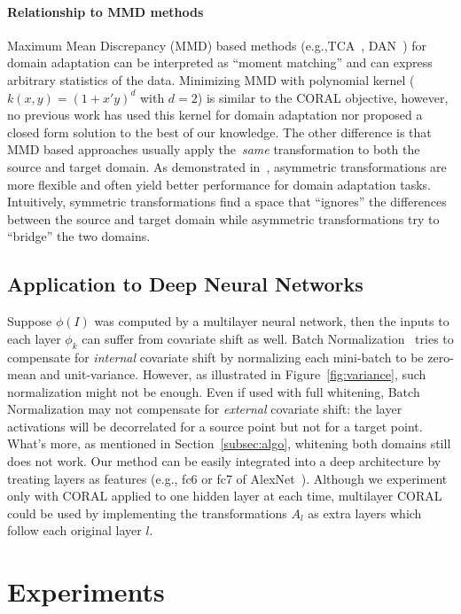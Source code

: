 \documentclass[letterpaper]{article}
\begin{document}
\paragraph{Relationship to MMD methods}
Maximum Mean Discrepancy (MMD) based methods (e.g.,TCA~\cite{tca}, DAN~\cite{dan_long15}) for domain adaptation can be interpreted as ``moment matching'' and can express arbitrary statistics of the data. Minimizing MMD with polynomial kernel ($k(x,y) = (1+x'y)^d$ with $d=2$) is similar to the CORAL objective, however, no previous work has used this kernel for domain adaptation nor proposed a closed form solution to the best of our knowledge.
The other difference is that MMD based approaches usually apply the~\emph{same} transformation to both the source and target domain.  As demonstrated in~\cite{ref:kulis_cvpr11,outlooks,sasb}, asymmetric transformations are more flexible and often yield better performance for domain adaptation tasks. Intuitively, symmetric transformations find a space that ``ignores'' the differences between the source and target domain while asymmetric transformations try to ``bridge'' the two domains.

\subsection{Application to Deep Neural Networks}
Suppose $\phi(I)$ was computed by a multilayer neural network, then the inputs to each layer $\phi_k$ can suffer from covariate shift as well. Batch Normalization~\cite{batchnorm} tries to compensate for \emph{internal} covariate shift by normalizing each mini-batch to be zero-mean and unit-variance. However, as illustrated in Figure~\ref{fig:variance}, such normalization might not be enough. Even if used with full whitening, Batch Normalization may not compensate for \emph{external} covariate shift: the layer activations will be decorrelated for a source point but not for a target point. What's more, as mentioned in Section~\ref{subsec:algo}, whitening both domains still does not work. Our method can be easily integrated into a deep architecture by treating layers as features (e.g., fc6 or fc7 of AlexNet~\cite{alexnet}). Although we experiment only with CORAL applied to one hidden layer at each time, multilayer CORAL could be used by implementing the transformations $A_l$ as extra layers which follow each original layer $l$.
\section{Experiments}
\label{sec:exp}
\end{document}
